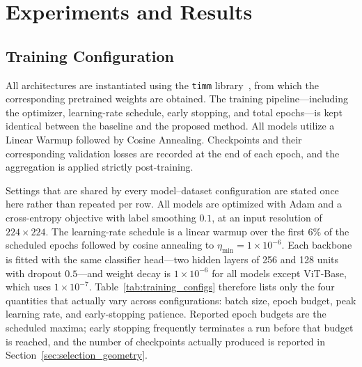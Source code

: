 \documentclass[runningheads]{llncs}
\begin{document}

\section{Experiments and Results}
\label{sec:ExpandResults}

\subsection{Training Configuration}

All architectures are instantiated using the \texttt{timm}
library~\cite{rw2019timm}, from which the corresponding pretrained
weights are obtained. The training pipeline---including the optimizer, learning-rate schedule, early stopping, and total epochs---is kept identical between the baseline and the proposed method. All models utilize a Linear Warmup followed by Cosine Annealing. Checkpoints and their corresponding validation losses are recorded at the end of each epoch, and the aggregation is applied strictly post-training.

Settings that are shared by every model--dataset configuration are stated once
here rather than repeated per row. All models are optimized with
Adam and a cross-entropy objective with label smoothing $0.1$, at an input
resolution of $224\times224$. The learning-rate schedule is a linear warmup
over the first $6\%$ of the scheduled epochs followed by cosine annealing to
$\eta_{\min}=1\times10^{-6}$. Each backbone is fitted with the same classifier
head---two hidden layers of 256 and 128 units with dropout $0.5$---and weight
decay is $1\times10^{-6}$ for all models except ViT-Base, which uses
$1\times10^{-7}$. Table~\ref{tab:training_configs} therefore lists only the
four quantities that actually vary across configurations: batch size, epoch
budget, peak learning rate, and early-stopping patience. Reported epoch
budgets are the scheduled maxima; early stopping frequently terminates a run
before that budget is reached, and the number of checkpoints actually produced
is reported in Section~\ref{sec:selection_geometry}.
\end{document}
